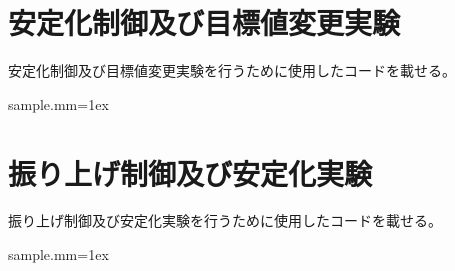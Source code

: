\section{安定化制御及び目標値変更実験}
	安定化制御及び目標値変更実験を行うために使用したコードを載せる。
	\begin{itembox}[l]{sample.mm}\baselineskip=1ex
		\begin{verbatimtab}[4]

		\end{verbatimtab}
	\end{itembox}
\section{振り上げ制御及び安定化実験}
	振り上げ制御及び安定化実験を行うために使用したコードを載せる。
	\begin{itembox}[l]{sample.mm}\baselineskip=1ex
		\begin{verbatimtab}[4]

		\end{verbatimtab}
	\end{itembox}
